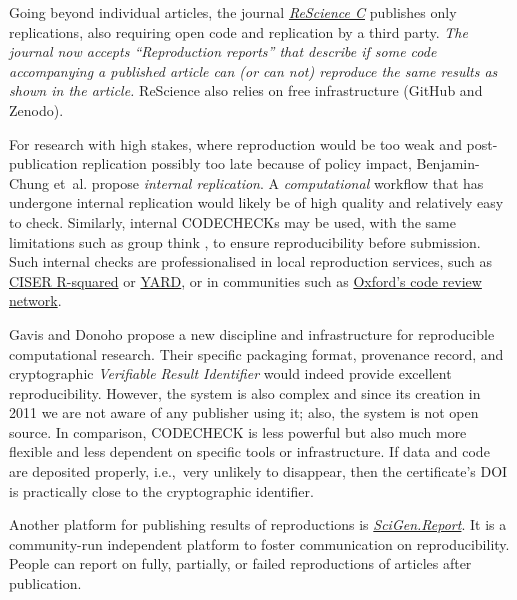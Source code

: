 \documentclass[12pt]{article}
\newcommand{\rev}[1]{\textit{#1}}
\begin{document}
Going beyond individual articles, the journal
\href{https://rescience.github.io}{\emph{ReScience C}} publishes only
replications, also requiring open code and replication by a third
party.  \rev{The journal now accepts ``Reproduction reports'' that
  describe if some code accompanying a published article can (or can
  not) reproduce the same results as shown in the article.}  ReScience
also relies on free infrastructure (GitHub and Zenodo).

For research with high stakes, where reproduction would be too weak and
post-publication replication possibly too late because of policy impact,
Benjamin-Chung et~al. \cite{benjamin-chung_internal_2020} propose
\emph{internal replication}.
A \rev{computational} workflow that has undergone internal
replication would likely be of high quality and relatively easy to check.
Similarly, internal CODECHECKs may be used, with the same limitations such
as group think \cite{benjamin-chung_internal_2020},
to ensure reproducibility before submission.
Such internal checks are professionalised in local reproduction services,
such as \href{https://ciser.cornell.edu/research/results-reproduction-r-squared-service/}{CISER R-squared} or \href{https://isps.yale.edu/research/data/approach}{YARD},
or in communities such as \href{https://github.com/OxfordCodeReviewNet/forum}{Oxford's code review network}.

Gavis and Donoho \cite{gavish_universal_2011} propose a new discipline
and infrastructure for reproducible computational research. Their
specific packaging format, provenance record, and cryptographic
\emph{Verifiable Result Identifier} would indeed provide excellent
reproducibility. However, the system is also complex and since its
creation in 2011 we are not aware of any publisher using it; also, the
system is not open source.  In comparison, CODECHECK is less powerful
but also much more flexible and less dependent on specific tools or
infrastructure. If data and code are deposited properly, i.e.,~very
unlikely to disappear, then the certificate's DOI is practically close
to the cryptographic identifier.

Another platform for publishing results of reproductions is
\href{https://scigen.report}{\emph{SciGen.Report}}.  It is a
community-run independent platform to foster communication on
reproducibility.  People can report on fully, partially, or
failed reproductions of articles after publication.
\end{document}
